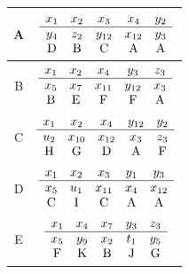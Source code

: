 \documentclass[10pt,a4paper]{amsart}
\numberwithin{equation}{section}
\theoremstyle{definition}
\begin{document}
\begin{table}[th!]\renewcommand{\arraystretch}{1.2}
\centering
\begin{tabular}{|c|c|} \hline
A & $\begin{array}{ccccc}
x_1&x_2&x_3&x_4&y_2 \\ \hline
y_4&z_2&y_{12}&x_{12}&y_3 \\
\text D&\text B&\text C&\text A&\text A
\end{array}$ \\ \hline
B & $\begin{array}{ccccc}
x_1&x_2&x_4&y_3&z_3 \\ \hline
x_5&x_7&x_{11}&y_{12}&x_3 \\
\text B&\text E&\text F&\text F&\text A
\end{array}$ \\ \hline
C & $\begin{array}{ccccc}
x_1&x_2&x_4&y_{12}&y_2 \\ \hline
u_2&x_{10}&x_{12}&x_3&z_3 \\
\text H&\text G&\text D&\text A&\text F
\end{array}$ \\ \hline
D & $\begin{array}{ccccc}
x_1&x_2&x_3&y_1&y_3 \\ \hline
x_5&u_1&x_{11}&x_{4}&x_{12} \\
\text C&\text I&\text C&\text A&\text A
\end{array}$ \\ \hline
E & $\begin{array}{ccccc}
x_1&x_4&x_7&y_3&z_3 \\ \hline
x_5&y_9&x_2&t_1&y_5 \\
\text F&\text K&\text B&\text J&\text G
\end{array}$ \\ \hline
\end{tabular}
\end{table}
\end{document}
